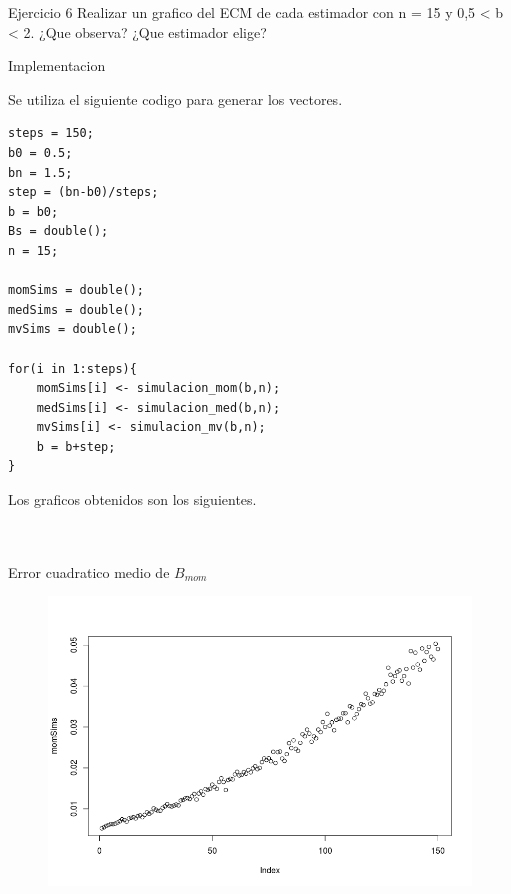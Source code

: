 



\begin{section}{Ejercicio 6}
Realizar un grafico del ECM de cada estimador con n = 15 y 0,5 < b < 2. ¿Que observa?
¿Que estimador elige?

\begin{subsection}{Implementacion}


Se utiliza el siguiente codigo para generar los vectores.
\begin{verbatim}
steps = 150;
b0 = 0.5;
bn = 1.5;
step = (bn-b0)/steps;
b = b0;
Bs = double();
n = 15;

momSims = double();
medSims = double();
mvSims = double();

for(i in 1:steps){
	momSims[i] <- simulacion_mom(b,n);
	medSims[i] <- simulacion_med(b,n);
	mvSims[i] <- simulacion_mv(b,n);
	b = b+step;
}
\end{verbatim}
Los graficos obtenidos son los siguientes.

~\\
~\\

Error cuadratico medio de $B_{mom}$
\begin{figure}[H]
\includegraphics[scale=0.65]{plots/momSims.png}
\centering
\end{figure}
~\\
~\\


\end{subsection}
\end{section}
